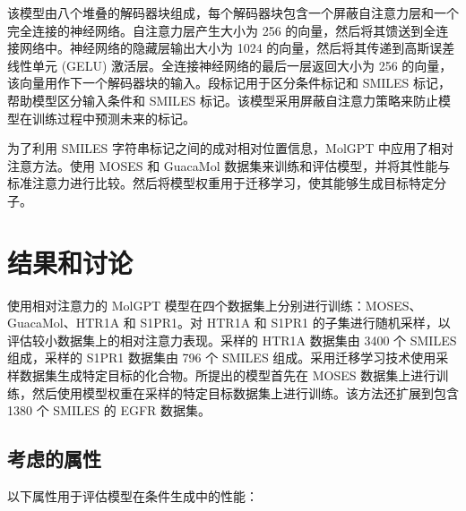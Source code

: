 该模型由八个堆叠的解码器块组成，每个解码器块包含一个屏蔽自注意力层和一个完全连接的神经网络。自注意力层产生大小为 256 的向量，然后将其馈送到全连接网络中。神经网络的隐藏层输出大小为 1024 的向量，然后将其传递到高斯误差线性单元 (GELU) 激活层。全连接神经网络的最后一层返回大小为 256 的向量，该向量用作下一个解码器块的输入。段标记用于区分条件标记和 SMILES 标记，帮助模型区分输入条件和 SMILES 标记。该模型采用屏蔽自注意力策略来防止模型在训练过程中预测未来的标记。

为了利用 SMILES 字符串标记之间的成对相对位置信息，MolGPT 中应用了相对注意方法。使用 MOSES 和 GuacaMol 数据集来训练和评估模型，并将其性能与标准注意力进行比较。然后将模型权重用于迁移学习，使其能够生成目标特定分子。

\section{结果和讨论}

使用相对注意力的 MolGPT 模型在四个数据集上分别进行训练：MOSES、GuacaMol、HTR1A 和 S1PR1。对 HTR1A 和 S1PR1 的子集进行随机采样，以评估较小数据集上的相对注意力表现。采样的 HTR1A 数据集由 3400 个 SMILES 组成，采样的 S1PR1 数据集由 796 个 SMILES 组成。采用迁移学习技术使用采样数据集生成特定目标的化合物。所提出的模型首先在 MOSES 数据集上进行训练，然后使用模型权重在采样的特定目标数据集上进行训练。该方法还扩展到包含 1380 个 SMILES 的 EGFR 数据集。

\subsection{考虑的属性}

以下属性用于评估模型在条件生成中的性能：

